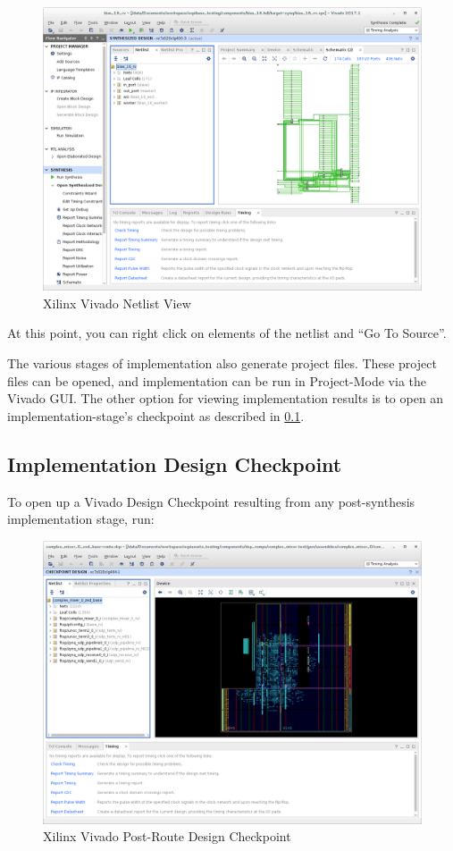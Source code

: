 \begin{flushleft}
\begin{figure}[H]
	\centerline{\includegraphics[scale=0.4]{figures/xilinx_vivado_netlist_view}}
	\caption{Xilinx Vivado Netlist View}
\end{figure}
At this point, you can right click on elements of the netlist and ``Go To Source''.\newline

The various stages of implementation also generate project files. These project files can be opened, and implementation can be run in Project-Mode via the Vivado GUI. The other option for viewing implementation results is to open an implementation-stage's checkpoint as described in \ref{dcp}.

\subsection{Implementation Design Checkpoint}
\label{dcp}
To open up a Vivado Design Checkpoint resulting from any post-synthesis implementation stage, run:\newline
{}\newline
\begin{figure}[H]
	\centerline{\includegraphics[scale=0.4]{figures/xilinx_vivado_post_route_dcp}}
	\caption{Xilinx Vivado Post-Route Design Checkpoint}
\end{figure}


\end{flushleft}
